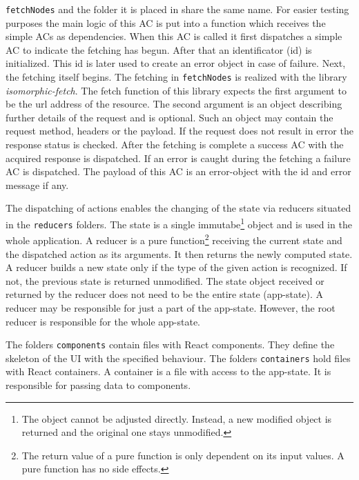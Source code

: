 \texttt{fetchNodes} and the folder it is placed in share the same name. For easier testing purposes the main logic of this AC is put into a function which receives the simple ACs as dependencies. When this AC is called it first dispatches a simple AC to indicate the fetching has begun. After that an identificator (id) is initialized. This id is later used to create an error object in case of failure. Next, the fetching itself begins. The fetching in \texttt{fetchNodes} is realized with the library \textit{isomorphic-fetch}. The fetch function of this library expects the first argument to be the url address of the resource. The second argument is an object describing further details of the request and is optional. Such an object may contain the request method, headers or the payload. If the request does not result in error the response status is checked. After the fetching is complete a success AC with the acquired response is dispatched. If an error is caught during the fetching a failure AC is dispatched. The payload of this AC is an error-object with the id and error message if any.

The dispatching of actions enables the changing of the state via reducers situated in the \texttt{reducers} folders. The state is a single immutabe\footnote{The object cannot be adjusted directly. Instead, a new modified object is returned and the original one stays unmodified.} object and is used in the whole application. A \hypertarget{reducers}{reducer} is a pure function\footnote{The return value of a pure function is only dependent on its input values. A pure function has no side effects.} receiving the current state and the dispatched action as its arguments. It then returns the newly computed state. A reducer builds a new state only if the type of the given action is recognized. If not, the previous state is returned unmodified. The state object received or returned by the reducer does not need to be the entire state (app-state). A reducer may be responsible for just a part of the app-state. However, the root reducer is responsible for the whole app-state.

The folders \texttt{components} contain files with React components. They define the skeleton of the UI with the specified behaviour. The folders \texttt{containers} hold files with React containers. A container is a file with access to the app-state. It is responsible for passing data to components. 
